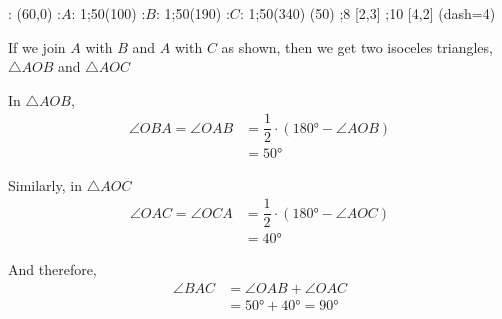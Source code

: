 \ifprintanswers
\fi 
\begin{marginfigure}
    : (60,0)
    :$A$: 1;50(100)
    :$B$: 1;50(190)
    :$C$: 1;50(340)
	\figdrawbegin{}
	(50)
    \figdrawline [1,2]
    \figdrawline [1,3]
    \figdrawline [1,4]
    ;8 [2,3]
    ;10 [4,2]
    \ifprintanswers
      \figset (dash=4)
      \figdrawline [3,2,4]
    \fi
	\figdrawend
  \centerline{\box\figBoxA}
\end{marginfigure}
\begin{solution}[\halfpage]
	If we join $A$ with $B$ and $A$ with $C$ as shown, then we get two isoceles 
	triangles, $\triangle AOB$ and $\triangle AOC$
	
	In $\triangle AOB$,
	\begin{align}
		\angle OBA = \angle OAB &= \dfrac{1}{2}\cdot(\ang{180}-\angle AOB) \\
		                        &= \ang{50}
	\end{align}
	
	Similarly, in $\triangle AOC$
	\begin{align}
		\angle OAC = \angle OCA &= \dfrac{1}{2}\cdot(\ang{180}-\angle AOC) \\
		                        &= \ang{40}
	\end{align}
	
	And therefore,
	\begin{align}
		\angle BAC &= \angle OAB + \angle OAC \\
		           &= \ang{50} + \ang{40} = \ang{90}
	\end{align}
\end{solution}
